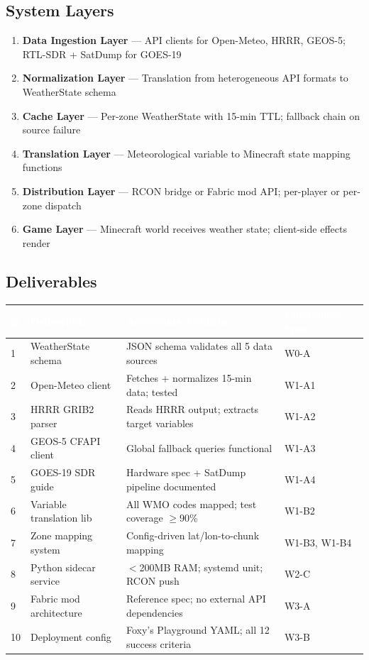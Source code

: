 \documentclass[11pt,letterpaper]{article}
\newcommand{\tableheader}[1]{\textbf{\sffamily\textcolor{white}{#1}}}
\begin{document}
\subsection{System Layers}

\begin{enumerate}[noitemsep]
  \item \textbf{Data Ingestion Layer} --- API clients for Open-Meteo, HRRR, GEOS-5; RTL-SDR + SatDump for GOES-19
  \item \textbf{Normalization Layer} --- Translation from heterogeneous API formats to WeatherState schema
  \item \textbf{Cache Layer} --- Per-zone WeatherState with 15-min TTL; fallback chain on source failure
  \item \textbf{Translation Layer} --- Meteorological variable to Minecraft state mapping functions
  \item \textbf{Distribution Layer} --- RCON bridge or Fabric mod API; per-player or per-zone dispatch
  \item \textbf{Game Layer} --- Minecraft world receives weather state; client-side effects render
\end{enumerate}

\subsection{Deliverables}

\begin{center}
\begin{tabularx}{\textwidth}{C{0.5cm}L{3.5cm}L{4cm}L{3cm}}
\toprule
{}
\tableheader{\#} & \tableheader{Deliverable} & \tableheader{Acceptance Criteria} & \tableheader{Component Spec} \\
 & WeatherState schema & JSON schema validates all 5 data sources & W0-A \\
2 & Open-Meteo client & Fetches + normalizes 15-min data; tested & W1-A1 \\
3 & HRRR GRIB2 parser & Reads HRRR output; extracts target variables & W1-A2 \\
4 & GEOS-5 CFAPI client & Global fallback queries functional & W1-A3 \\
5 & GOES-19 SDR guide & Hardware spec + SatDump pipeline documented & W1-A4 \\
6 & Variable translation lib & All WMO codes mapped; test coverage $\geq$90\% & W1-B2 \\
7 & Zone mapping system & Config-driven lat/lon-to-chunk mapping & W1-B3, W1-B4 \\
8 & Python sidecar service & $<$200MB RAM; systemd unit; RCON push & W2-C \\
9 & Fabric mod architecture & Reference spec; no external API dependencies & W3-A \\
10 & Deployment config & Foxy's Playground YAML; all 12 success criteria & W3-B \\
\bottomrule
\end{tabularx}
\end{center}
\end{document}
